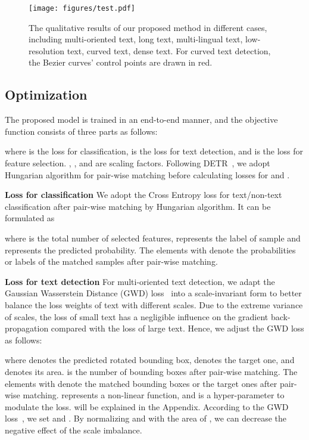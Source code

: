 \documentclass[10pt,twocolumn,letterpaper]{article}
\begin{document}
\begin{figure*}[tb]
\centering
\texttt{[image: figures/test.pdf]}
\caption{The qualitative results of our proposed method in different cases, including multi-oriented text, long text, multi-lingual text, low-resolution text, curved text, dense text. For curved text detection, the Bezier curves' control points are drawn in red.
}
\label{fig:results}
\end{figure*}


\subsection{Optimization}
The proposed model is trained in an end-to-end manner, and the objective function consists of three parts as follows:

where 
 is the loss for classification,  is the loss for text detection, and  is the loss for feature selection.
, , and  are scaling factors.
Following DETR~\cite{carion2020detr}, we adopt Hungarian algorithm for pair-wise matching before calculating losses for  and .


\textbf{Loss for classification}
We adopt the Cross Entropy loss for text/non-text classification after pair-wise matching by Hungarian algorithm. It can be formulated as

where  is the total number of selected features,  represents the label of sample  and  represents the predicted probability. The elements with  denote the probabilities or labels of the matched samples after pair-wise matching.


\textbf{Loss for text detection}
For multi-oriented text detection, we adapt the Gaussian Wasserstein Distance (GWD) loss~\cite{GWD} into a scale-invariant form to better balance the loss weights of text with different scales. Due to the extreme variance of scales, the loss of small text has a negligible influence on the gradient back-propagation compared with the loss of large text.
Hence, we adjust the GWD loss as follows:

where  denotes the predicted rotated bounding box,  denotes the target one, and  denotes its area.
 is the number of bounding boxes after pair-wise matching.
The elements with  denote the matched bounding boxes or the target ones after pair-wise matching.
 represents a non-linear function, and  is a hyper-parameter to modulate the loss.  will be explained in the Appendix.
According to the GWD loss~\cite{GWD}, we set  and .
By normalizing  and  with the area of , we can decrease the negative effect of the scale imbalance.
\end{document}
